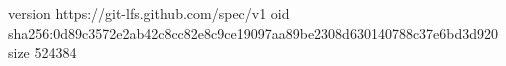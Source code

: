 version https://git-lfs.github.com/spec/v1
oid sha256:0d89c3572e2ab42c8cc82e8c9ce19097aa89be2308d630140788c37e6bd3d920
size 524384
